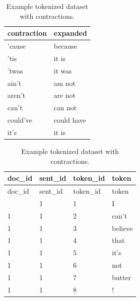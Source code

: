 \documentclass[
  letterpaper,
  DIV=11,
  numbers=noendperiod]{scrreport}
\theoremstyle{definition}
\theoremstyle{remark}
\begin{document}
\begin{table}

\begin{minipage}[t]{0.50\linewidth}

{\centering 

\hypertarget{tbl-td-merging-join-lexicon-contractions-list}{}
\caption{\label{tbl-td-merging-join-lexicon-contractions-list}Common contractions and expanded forms. }\tabularnewline

\centering
\begin{tabular}{l|l}
\hline
contraction & expanded\\
\hline
'cause & because\\
\hline
'tis & it is\\
\hline
'twas & it was\\
\hline
ain't & am not\\
\hline
aren't & are not\\
\hline
can't & can not\\
\hline
could've & could have\\
\hline
it's & it is\\
\hline
\end{tabular}

}

\end{minipage}%
%
\begin{minipage}[t]{0.50\linewidth}

{\centering 

\begin{longtable}[]{@{}llll@{}}
\caption{\label{tbl-td-merging-join-lexicon-contractions}Example
tokenized dataset with contractions.}\tabularnewline
\toprule\noalign{}
doc\_id & sent\_id & token\_id & token \\
\midrule\noalign{}
\endfirsthead
\toprule\noalign{}
doc\_id & sent\_id & token\_id & token \\
\midrule\noalign{}
\endhead
\bottomrule\noalign{}
\endlastfoot
1 & 1 & 1 & I \\
1 & 1 & 2 & can't \\
1 & 1 & 3 & believe \\
1 & 1 & 4 & that \\
1 & 1 & 5 & it's \\
1 & 1 & 6 & not \\
1 & 1 & 7 & butter \\
1 & 1 & 8 & ! \\
\end{longtable}

}

\end{minipage}%

\end{table}
\end{document}
